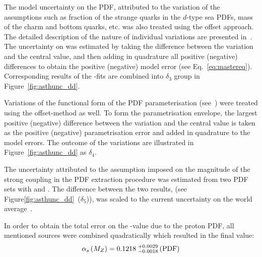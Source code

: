 The model uncertainty on the PDF, attributed to the variation of the assumptions such as fraction of the strange quarks in the $d$-type sea PDFs, mass of the charm and bottom quarks, etc. was also treated using the offset approach. The detailed description of the nature of individual variations are presented in~\cite{herapdf1.5}. The uncertainty on \asz was estimated  by taking the difference between the variation and the central value, and then adding in quadrature all positive (negative) differences to obtain the positive (negative) model error (see Eq.~\eqref{eq:mastereq}). Corresponding results of the \as-fits are combined into $\delta_3$ group in Figure~\ref{fig:asthunc_dd}. 

Variations of the functional form of the PDF parameterisation (see~\cite{herapdf1.5}) were treated using the offset-method as well. To form the parametrisation envelope, the largest positive (negative) difference between the variation and the central value is taken as the positive (negative) parametrisation error and added in quadrature to the model errors. The outcome of the variations are illustrated in Figure~\ref{fig:asthunc_dd} as $\delta_4$.

The uncertainty attributed to the assumption imposed on the magnitude of the strong coupling in the PDF extraction procedure was estimated from two PDF sets with  and . The difference between the two results, (see Figure\ref{fig:asthunc_dd}~($\delta_5$)), was scaled to the current uncertainty on the world average~\cite{Bethke:2012jm}.

In order to obtain the total error on the \asz-value due to the proton PDF, all mentioned sources were combined quadratically which resulted in the final value:
\begin{equation}
 \mbox{$\alpha_{s}\left(M_{Z}\right)$} = 0.1218\;^{+0.0029}_{-0.0018}\left(\text{PDF}\right)
\end{equation}

